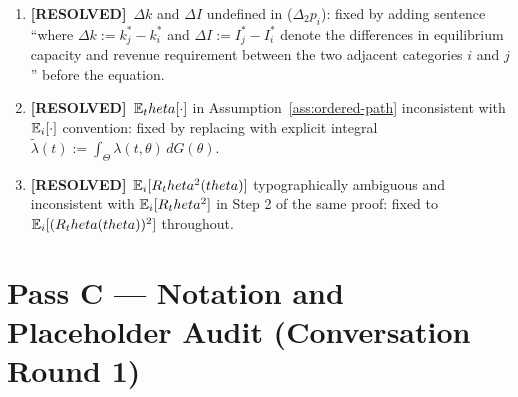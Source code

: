 \documentclass{class}
\newcommand{\ok}{\textcolor{ok}{\textbf{[RESOLVED]}}}
\begin{document}
\begin{enumerate}[leftmargin=1.5cm]
\item \ok\ $\Delta k$ and $\Delta I$ undefined in ($\Delta_2 p_i$): fixed by adding sentence ``where $\Delta k := k_j^\ast - k_i^\ast$ and $\Delta I := I_j^\ast - I_i^\ast$ denote the differences in equilibrium capacity and revenue requirement between the two adjacent categories $i$ and $j$'' before the equation.
\item \ok\ $\mathbb{E}_theta[\cdot]$ in Assumption~\ref{ass:ordered-path} inconsistent with $\mathbb{E}_i[\cdot]$ convention: fixed by replacing with explicit integral $\tilde\lambda(t):=\int_\Theta\lambda(t,\theta)\,dG(\theta)$.
\item \ok\ $\mathbb{E}_i[R_theta^2(theta)]$ typographically ambiguous and inconsistent with $\mathbb{E}_i[R_theta^2]$ in Step 2 of the same proof: fixed to $\mathbb{E}_i[(R_theta(theta))^2]$ throughout.
\end{enumerate}

\section*{Pass C --- Notation and Placeholder Audit (Conversation Round 1)}
\end{document}
